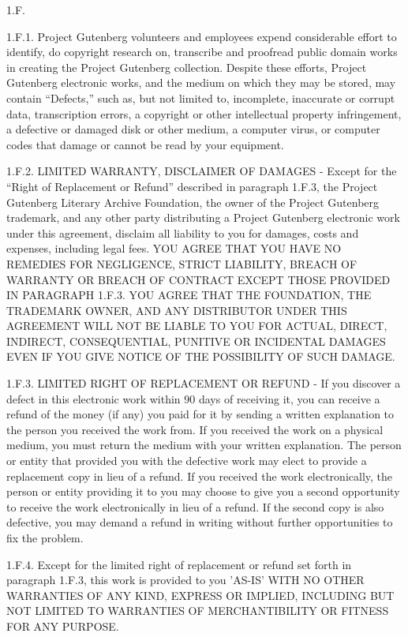 1.F.

1.F.1.  Project Gutenberg volunteers and employees expend considerable
effort to identify, do copyright research on, transcribe and proofread
public domain works in creating the Project Gutenberg\texttrademark{}
collection.  Despite these efforts, Project Gutenberg\texttrademark{} electronic
works, and the medium on which they may be stored, may contain
``Defects,'' such as, but not limited to, incomplete, inaccurate or
corrupt data, transcription errors, a copyright or other intellectual
property infringement, a defective or damaged disk or other medium, a
computer virus, or computer codes that damage or cannot be read by
your equipment.

1.F.2.  LIMITED WARRANTY, DISCLAIMER OF DAMAGES - Except for the ``Right
of Replacement or Refund'' described in paragraph 1.F.3, the Project
Gutenberg Literary Archive Foundation, the owner of the Project
Gutenberg\texttrademark{} trademark, and any other party distributing a Project
Gutenberg\texttrademark{} electronic work under this agreement, disclaim all
liability to you for damages, costs and expenses, including legal
fees.  YOU AGREE THAT YOU HAVE NO REMEDIES FOR NEGLIGENCE, STRICT
LIABILITY, BREACH OF WARRANTY OR BREACH OF CONTRACT EXCEPT THOSE
PROVIDED IN PARAGRAPH 1.F.3.  YOU AGREE THAT THE FOUNDATION, THE
TRADEMARK OWNER, AND ANY DISTRIBUTOR UNDER THIS AGREEMENT WILL NOT BE
LIABLE TO YOU FOR ACTUAL, DIRECT, INDIRECT, CONSEQUENTIAL, PUNITIVE OR
INCIDENTAL DAMAGES EVEN IF YOU GIVE NOTICE OF THE POSSIBILITY OF SUCH
DAMAGE.

1.F.3.  LIMITED RIGHT OF REPLACEMENT OR REFUND - If you discover a
defect in this electronic work within 90 days of receiving it, you can
receive a refund of the money (if any) you paid for it by sending a
written explanation to the person you received the work from.  If you
received the work on a physical medium, you must return the medium with
your written explanation.  The person or entity that provided you with
the defective work may elect to provide a replacement copy in lieu of a
refund.  If you received the work electronically, the person or entity
providing it to you may choose to give you a second opportunity to
receive the work electronically in lieu of a refund.  If the second copy
is also defective, you may demand a refund in writing without further
opportunities to fix the problem.

1.F.4.  Except for the limited right of replacement or refund set forth
in paragraph 1.F.3, this work is provided to you 'AS-IS' WITH NO OTHER
WARRANTIES OF ANY KIND, EXPRESS OR IMPLIED, INCLUDING BUT NOT LIMITED TO
WARRANTIES OF MERCHANTIBILITY OR FITNESS FOR ANY PURPOSE.

